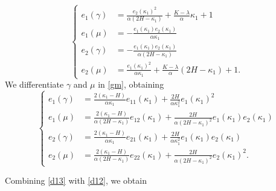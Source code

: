 \documentclass[a4paper,12pt]{amsart}
\theoremstyle{definition}
\begin{document}
\begin{equation}\label{d12}
\left\{
\begin{split}
e_1(\gamma)&=\frac{e_2(\kappa_1)^2}{\alpha(2H-\kappa_1)}+\frac{K-\lambda}{\alpha}\kappa_1+1\\
e_1(\mu)&=-\frac{e_1(\kappa_1)e_2(\kappa_1)}{\alpha\kappa_1}\\
e_2(\gamma)&=-\frac{e_1(\kappa_1)e_2(\kappa_1)}{\alpha(2H-\kappa_1)}\\
e_2(\mu)&=\frac{e_1(\kappa_1)^2}{\alpha\kappa_1}+\frac{K-\lambda}{\alpha}(2H-\kappa_1)+1.
\end{split}\right.
\end{equation}
We differentiate $\gamma$ and $\mu$ in \eqref{gm}, obtaining
\begin{equation}\label{d13}\left\{
\begin{split}
e_1(\gamma)&=\frac{2(\kappa_1-H)}{\alpha\kappa_1}e_{11}(\kappa_1)+\frac{2H}{\alpha \kappa_1^2}e_1(\kappa_1)^2 \\
e_1(\mu)&= \frac{2(\kappa_1-H)}{\alpha(2H-\kappa_1)}e_{12}(\kappa_1)+\frac{2H}{\alpha(2H-\kappa_1)^2}e_1(\kappa_1)e_2(\kappa_1)\\
e_2(\gamma)&= \frac{2(\kappa_1-H)}{\alpha \kappa_1}e_{21}(\kappa_1)+\frac{2H}{\alpha\kappa_1^2}e_1(\kappa_1)e_2(\kappa_1)\\
e_2(\mu)&= \frac{2(\kappa_1-H)}{\alpha(2H-\kappa_1)}e_{22}(\kappa_1)+\frac{2H}{\alpha(2H-\kappa_1)^2}e_2(\kappa_1)^2.
\end{split}\right.
\end{equation}



 Combining \eqref{d13} with \eqref{d12}, we obtain 
\end{document}
